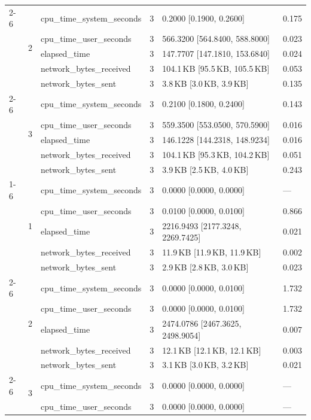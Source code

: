 \begin{tabular}{lllrll}
\cline{2-6}
 & \multirow[t]{5}{*}{2} & cpu_time_system_seconds & 3 & 0.2000 [0.1900, 0.2600] & 0.175 \\
 &  & cpu_time_user_seconds & 3 & 566.3200 [564.8400, 588.8000] & 0.023 \\
 &  & elapsed_time & 3 & 147.7707 [147.1810, 153.6840] & 0.024 \\
 &  & network_bytes_received & 3 & 104.1\,KB [95.5\,KB, 105.5\,KB] & 0.053 \\
 &  & network_bytes_sent & 3 & 3.8\,KB [3.0\,KB, 3.9\,KB] & 0.135 \\
\cline{2-6}
 & \multirow[t]{5}{*}{3} & cpu_time_system_seconds & 3 & 0.2100 [0.1800, 0.2400] & 0.143 \\
 &  & cpu_time_user_seconds & 3 & 559.3500 [553.0500, 570.5900] & 0.016 \\
 &  & elapsed_time & 3 & 146.1228 [144.2318, 148.9234] & 0.016 \\
 &  & network_bytes_received & 3 & 104.1\,KB [95.3\,KB, 104.2\,KB] & 0.051 \\
 &  & network_bytes_sent & 3 & 3.9\,KB [2.5\,KB, 4.0\,KB] & 0.243 \\
\cline{1-6} \cline{2-6}
\multirow[t]{15}{*}{national-scale-spatial-join-postgis-medium} & \multirow[t]{5}{*}{1} & cpu_time_system_seconds & 3 & 0.0000 [0.0000, 0.0000] & --- \\
 &  & cpu_time_user_seconds & 3 & 0.0100 [0.0000, 0.0100] & 0.866 \\
 &  & elapsed_time & 3 & 2216.9493 [2177.3248, 2269.7425] & 0.021 \\
 &  & network_bytes_received & 3 & 11.9\,KB [11.9\,KB, 11.9\,KB] & 0.002 \\
 &  & network_bytes_sent & 3 & 2.9\,KB [2.8\,KB, 3.0\,KB] & 0.023 \\
\cline{2-6}
 & \multirow[t]{5}{*}{2} & cpu_time_system_seconds & 3 & 0.0000 [0.0000, 0.0100] & 1.732 \\
 &  & cpu_time_user_seconds & 3 & 0.0000 [0.0000, 0.0100] & 1.732 \\
 &  & elapsed_time & 3 & 2474.0786 [2467.3625, 2498.9054] & 0.007 \\
 &  & network_bytes_received & 3 & 12.1\,KB [12.1\,KB, 12.1\,KB] & 0.003 \\
 &  & network_bytes_sent & 3 & 3.1\,KB [3.0\,KB, 3.2\,KB] & 0.021 \\
\cline{2-6}
 & \multirow[t]{5}{*}{3} & cpu_time_system_seconds & 3 & 0.0000 [0.0000, 0.0000] & --- \\
 &  & cpu_time_user_seconds & 3 & 0.0000 [0.0000, 0.0000] & --- \\

\end{tabular}
